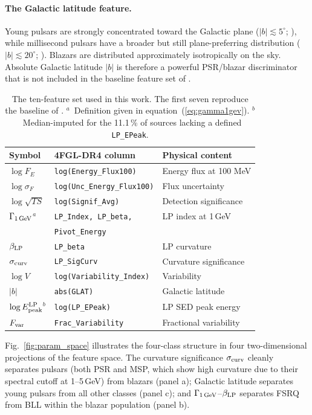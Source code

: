 \documentclass[fleqn,12pt]{article}
\newcommand{\fgl}{4FGL-DR4}
\newcommand{\sigs}{\sigma_{\rm curv}}
\newcommand{\GamLP}{\Gamma_{\rm 1\,GeV}}
\newcommand{\betaLP}{\beta_{\rm LP}}
\newcommand{\Epeak}{E^{\rm LP}_{\rm peak}}
\newcommand{\logV}{\log V}
\newcommand{\GALL}{|b|}
\newcommand{\Fvar}{F_{\rm var}}
\begin{document}
\paragraph{The Galactic latitude feature.}
Young pulsars are strongly concentrated toward the Galactic plane
($|b| \lesssim 5^\circ$; \citealt{Abdo2013}), while millisecond
pulsars have a broader but still plane-preferring distribution
($|b| \lesssim 20^\circ$; \citealt{Guillemot2016}). Blazars are
distributed approximately isotropically on the sky. Absolute Galactic
latitude $\GALL$ is therefore a powerful PSR/blazar discriminator that
is not included in the baseline feature set of \citet{Malyshev2023}.

\begin{table}
\caption{The ten-feature set used in this work.
The first seven reproduce the baseline of \protect\citet{Malyshev2023}.
$^a$~Definition given in equation~(\ref{eq:gamma1gev}).
$^b$~Median-imputed for the 11.1\,\% of sources lacking a defined
\texttt{LP\_EPeak}.}
\label{tab:features}
\begin{tabular}{lll}
\hline
Symbol & \fgl{} column & Physical content \\
\hline
$\log F_E$       & \texttt{log(Energy\_Flux100)} & Energy flux at 100 MeV \\
$\log\sigma_{F}$ & \texttt{log(Unc\_Energy\_Flux100)} & Flux uncertainty \\
$\log\sqrt{TS}$  & \texttt{log(Signif\_Avg)}  & Detection significance \\
$\GamLP$$^a$     & \texttt{LP\_Index, LP\_beta,} & LP index at 1\,GeV \\
                 & \texttt{Pivot\_Energy}       &  \\
$\betaLP$        & \texttt{LP\_beta}            & LP curvature \\
$\sigs$          & \texttt{LP\_SigCurv}         & Curvature significance \\
$\logV$          & \texttt{log(Variability\_Index)} & Variability \\
$\GALL$          & \texttt{abs(GLAT)}           & Galactic latitude \\
$\log\Epeak$$^b$ & \texttt{log(LP\_EPeak)}      & LP SED peak energy \\
$\Fvar$          & \texttt{Frac\_Variability}   & Fractional variability \\
\hline
\end{tabular}
\end{table}

Fig.~\ref{fig:param_space} illustrates the four-class structure
in four two-dimensional projections of the feature space. The
curvature significance $\sigs$ cleanly separates pulsars
(both PSR and MSP, which show high curvature due to their spectral
cutoff at 1--5\,GeV) from blazars (panel a); Galactic latitude
separates young pulsars from all other classes (panel c); and
$\GamLP$--$\betaLP$ separates FSRQ from BLL within the blazar
population (panel b).
\end{document}
